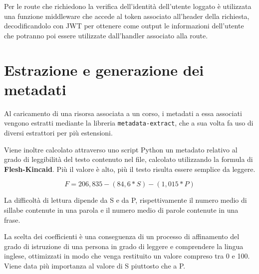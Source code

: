 Per le route che richiedono la verifica dell'identità dell'utente loggato è utilizzata una funzione middleware che accede al token associato all'header della richiesta, decodificandolo con JWT per ottenere come output le informazioni dell'utente che potranno poi essere utilizzate dall'handler associato alla route.

\section{Estrazione e generazione dei metadati}

Al caricamento di una risorsa associata a un corso, i metadati a essa associati vengono estratti mediante la libreria \texttt{metadata-extract}, che a sua volta fa uso di diversi estrattori per più estensioni.

Viene inoltre calcolato attraverso uno script Python un metadato relativo al grado di leggibilità del testo contenuto nel file, calcolato utilizzando la formula di \textbf{Flesh-Kincaid}. Più il valore è alto, più il testo risulta essere semplice da leggere.

\[ F=206,835-(84,6*S)-(1,015*P) \]

La difficoltà di lettura dipende da S e da P, rispettivamente il numero medio di sillabe contenute in una parola e il numero medio di parole contenute in una frase.

La scelta dei coefficienti è una conseguenza di un processo di affinamento del grado di istruzione di una persona in grado di leggere e comprendere la lingua inglese, ottimizzati in modo che venga restituito un valore compreso tra 0 e 100. Viene data più importanza al valore di S piuttosto che a P.\cite{readibility}
